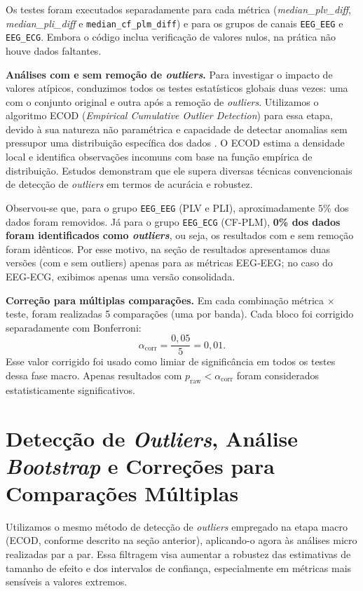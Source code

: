 Os testes foram executados separadamente para cada métrica (\textit{median\_plv\_diff}, \textit{median\_pli\_diff} e \texttt{median\_cf\_plm\_diff}) e para os grupos de canais \texttt{EEG\_EEG} e \texttt{EEG\_ECG}. Embora o código inclua verificação de valores nulos, na prática não houve dados faltantes.

\noindent\textbf{Análises com e sem remoção de \textit{outliers}.}  
Para investigar o impacto de valores atípicos, conduzimos todos os testes estatísticos globais duas vezes: uma com o conjunto original e outra após a remoção de \textit{outliers}. Utilizamos o algoritmo ECOD (\textit{Empirical Cumulative Outlier Detection}) para essa etapa, devido à sua natureza não paramétrica e capacidade de detectar anomalias sem pressupor uma distribuição específica dos dados \cite{li2022ecod}. O ECOD estima a densidade local e identifica observações incomuns com base na função empírica de distribuição. Estudos demonstram que ele supera diversas técnicas convencionais de detecção de \textit{outliers} em termos de acurácia e robustez.

Observou-se que, para o grupo \texttt{EEG\_EEG} (PLV e PLI), aproximadamente \(5\%\) dos dados foram removidos. Já para o grupo \texttt{EEG\_ECG} (CF-PLM), \textbf{0\% dos dados foram identificados como \textit{outliers}}, ou seja, os resultados com e sem remoção foram idênticos. Por esse motivo, na seção de resultados apresentamos duas versões (com e sem outliers) apenas para as métricas EEG‑EEG; no caso do EEG‑ECG, exibimos apenas uma versão consolidada.

\medskip
\noindent\textbf{Correção para múltiplas comparações.}  
Em cada combinação métrica × teste, foram realizadas 5 comparações (uma por banda). Cada bloco foi corrigido separadamente com Bonferroni:
\[
  \alpha_{\mathrm{corr}} = \frac{0{,}05}{5} = 0{,}01 .
\]
Esse valor corrigido foi usado como limiar de significância em todos os testes dessa fase macro. Apenas resultados com \(p_{\text{raw}} < \alpha_{\mathrm{corr}}\) foram considerados estatisticamente significativos.

\section{Detecção de \textit{Outliers}, Análise \textit{Bootstrap} e Correções para Comparações Múltiplas}
Utilizamos o mesmo método de detecção de \textit{outliers} empregado na etapa macro (ECOD, conforme descrito na seção anterior), aplicando-o agora às análises micro realizadas par a par. Essa filtragem visa aumentar a robustez das estimativas de tamanho de efeito e dos intervalos de confiança, especialmente em métricas mais sensíveis a valores extremos.

